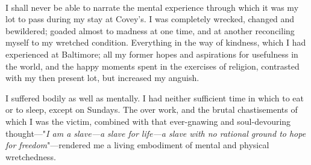 ~

I shall never be able to narrate the mental experience through which it
was my lot to pass during my stay at Covey's. I was completely wrecked,
changed and bewildered; goaded almost to madness at one time, and at
another reconciling myself to my wretched condition. Everything in the
way of kindness, which I had experienced at Baltimore; all my former
hopes and aspirations for usefulness in the world, and the happy moments
spent in the exercises of religion, contrasted with my then present lot,
but increased my anguish.

I suffered bodily as well as mentally. I had neither sufficient time in
which to eat or to sleep, except on Sundays. The over work, and the
brutal chastisements of which I was the victim, combined with that
ever-gnawing and soul-devouring thought---"\emph{I am a slave---a slave
for life---a slave with no rational ground to hope for
freedom}"---rendered me a living embodiment of mental and physical
wretchedness.
